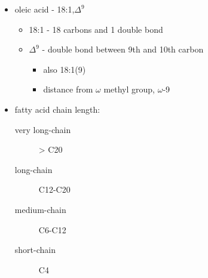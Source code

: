 \documentclass{scrartcl}
\begin{document}
\begin{itemize}
\item oleic acid - 18:1,\(\Delta^{\text{9}}\)
\begin{itemize}
\item 18:1 - 18 carbons and 1 double bond
\item \(\Delta^{\text{9}}\) - double bond between 9th and 10th carbon
\begin{itemize}
\item also 18:1(9)
\item distance from \(\omega\) methyl group, \(\omega\)-9
\end{itemize}
\end{itemize}

\item fatty acid chain length:
\begin{description}
\item[{very long-chain}] > C20
\item[{long-chain}] C12-C20
\item[{medium-chain}] C6-C12
\item[{short-chain}] C4
\end{description}
\end{itemize}
\end{document}
